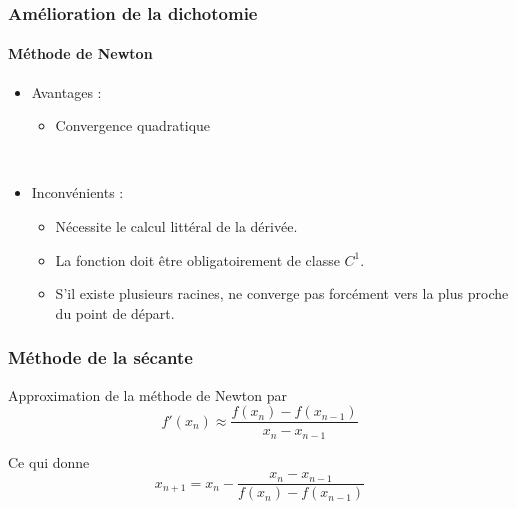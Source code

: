 
\begin{frame}
\frametitle{Amélioration de la dichotomie}
\framesubtitle{Méthode de Newton}

   \begin{itemize}
      \item Avantages :
         \begin{itemize}
            \item Convergence quadratique
         \end{itemize}
         ~
      \item Inconvénients :
      \begin{itemize}
         \item Nécessite le calcul littéral de la dérivée.
         \item La fonction doit être obligatoirement de classe $C^1$.
         \item S'il existe plusieurs racines, ne converge pas forcément vers la plus proche du point de départ.
      \end{itemize}
   \end{itemize}
\end{frame}




\begin{frame}
\frametitle{Méthode de la sécante}


Approximation de la méthode de Newton par
    \begin{equation}    
f'(x_n) \approx  \frac{f(x_{n}) - f(x_{n-1})}{x_{n}-x_{n-1}}        
    \end{equation}  
     
 
Ce qui donne
     \begin{equation}
        x_{n+1} = x_n - \frac{x_n - x_{n-1}}{f(x_n) - f(x_{n-1})}
     \end{equation}

\end{frame}





